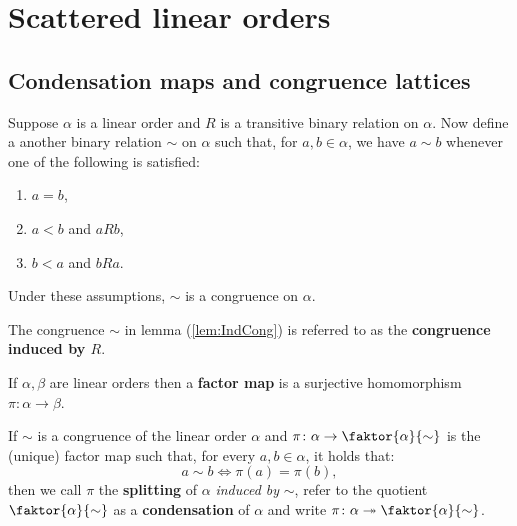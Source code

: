 \chapter{Scattered linear orders}


\section{Condensation maps and congruence lattices}

\begin{lem}\label{lem:IndCong}
        Suppose $\alpha$ is a linear order and $R$ is a transitive binary relation on $\alpha$.  Now define a another binary relation $\sim$ on $\alpha$ such that, for $a,b\in\alpha$, we have $a\sim b$ whenever one of the following is satisfied:
        \begin{enumerate}
            \item   $a=b$,
            \item   $a<b$ and $aRb$,
            \item   $b<a$ and $bRa$.
        \end{enumerate}
        Under these assumptions, $\sim$ is a congruence on $\alpha$.
\end{lem}

\begin{dfn}
        The congruence $\sim$ in lemma (\ref{lem:IndCong}) is referred to as the \textbf{congruence induced by $R$}.
\end{dfn}

\begin{dfn}
        If $\alpha,\beta$ are linear orders then a \textbf{factor map} is a surjective homomorphism $\pi\colon\alpha\rightarrow\beta$.
\end{dfn}

\begin{dfn}
        If $\sim$ is a congruence of the linear order $\alpha$ and $\pi\colon\alpha\to\faktor{\alpha}{\sim}$ is the (unique) factor map such that, for every $a,b\in\alpha$, it holds that:
        \begin{equation}
            	a\sim b\iff \pi(a)=\pi(b),
        \end{equation}
        then we call $\pi$ the \textbf{splitting} of $\alpha$ \textit{induced by} $\sim$, refer to the quotient $\faktor{\alpha}{\sim}$ as a \textbf{condensation} of $\alpha$ and write $\pi\colon\alpha\tto\faktor{\alpha}{\sim}$.
\end{dfn}

